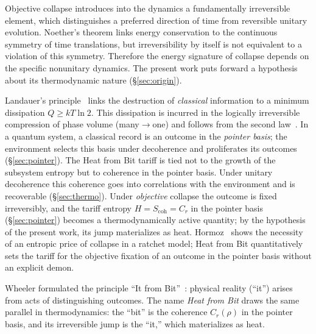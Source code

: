 \documentclass[11pt,a4paper]{article}
\newcommand{\Sref}[1]{\hyperref[#1]{\S\ref{#1}}}
\begin{document}
Objective collapse introduces into the dynamics a fundamentally irreversible element, which distinguishes a preferred direction of time from reversible unitary evolution. Noether's theorem links energy conservation to the continuous symmetry of time translations, but irreversibility by itself is not equivalent to a violation of this symmetry. Therefore the energy signature of collapse depends on the specific nonunitary dynamics. The present work puts forward a hypothesis about its thermodynamic nature (\Sref{sec:origin}).

Landauer's principle~\cite{landauer1961} links the destruction of \emph{classical} information to a minimum dissipation $Q \ge kT\ln 2$. This dissipation is incurred in the logically irreversible compression of phase volume (many$\to$one) and follows from the second law~\cite{bennett1982,sagawa2008}. In a quantum system, a classical record is an outcome in the \emph{pointer basis}; the environment selects this basis under decoherence and proliferates its outcomes (\Sref{sec:pointer}). The Heat from Bit tariff is tied not to the growth of the subsystem entropy but to coherence in the pointer basis. Under unitary decoherence this coherence goes into correlations with the environment and is recoverable (\Sref{sec:thermo}). Under \emph{objective} collapse the outcome is fixed irreversibly, and the tariff entropy $H=S_{\mathrm{coh}}=C_r$ in the pointer basis (\Sref{sec:pointer}) becomes a thermodynamically active quantity; by the hypothesis of the present work, its jump materializes as heat. Hormoz~\cite{hormoz2013} shows the necessity of an entropic price of collapse in a ratchet model; Heat from Bit quantitatively sets the tariff for the objective fixation of an outcome in the pointer basis without an explicit demon.

Wheeler formulated the principle ``It from Bit''~\cite{wheeler1989}: physical reality (``it'') arises from acts of distinguishing outcomes. The name \emph{Heat from Bit} draws the same parallel in thermodynamics: the ``bit'' is the coherence $C_r(\rho)$ in the pointer basis, and its irreversible jump is the ``it,'' which materializes as heat.
\end{document}
